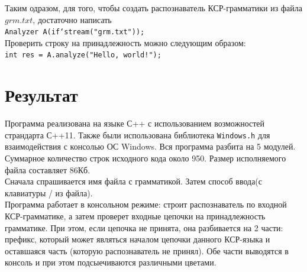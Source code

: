 \documentclass[12pt]{article}
\newcommand\tab[1][1cm]{\hspace*{#1}}
\begin{document}
Таким одразом, для того, чтобы создать распознаватель КСР-грамматики из файла $grm.txt$, достаточно написать \\
\tab\texttt{Analyzer A(if`stream("grm.txt"));}\\
Проверить строку на принадлежность можно следующим образом:\\
\tab \texttt{int res = A.analyze("Hello, world!");}

\section{Результат}

\tab Программа реализована на языке С++ с использованием возможностей страндарта С++11. Также были использована библиотека \texttt{Windows.h} для взаимодействия с консолью ОС Windows. Вся программа разбита на 5 модулей. Суммарное количество строк исходного кода около 950. Размер исполняемого файла составляет 86Кб.\\

Сначала спрашивается имя файла с грамматикой. Затем способ ввода(с клавиатуры / из файла).\\
Программа работает в консольном режиме: строит распознаватель по входной КСР-грамматике, а затем проверет входные цепочки на принадлежность грамматике. При этом, если цепочка не принята, она разбивается на 2 части: префикс, который может являться началом цепочки данного КСР-языка и оставшаяся часть (которую распознаватель не принял). Обе части выводятся в консоль и при этом подсыечиваются различными цветами.
\end{document}
